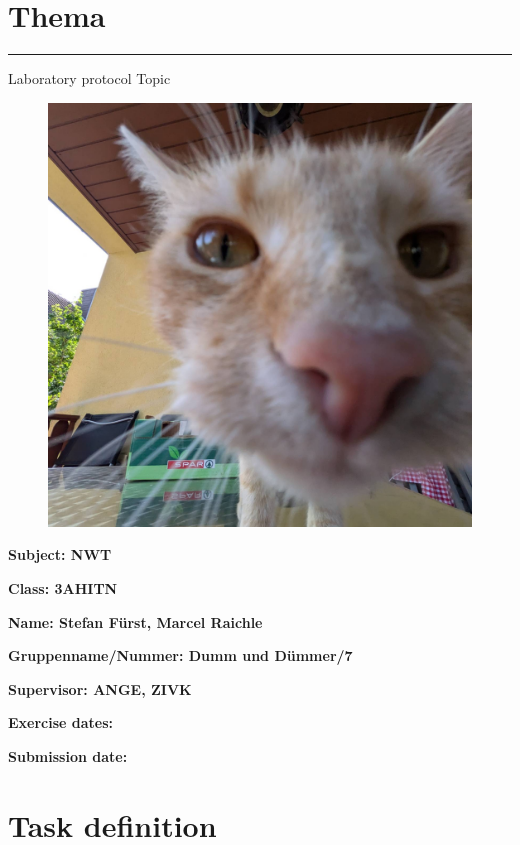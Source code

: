 \documentclass[a4paper]{article}
\newcommand{\abc}{\hfill \break}
\begin{document}

\pagestyle{oida}
\section*{Thema}
\par\noindent\rule{\textwidth}{0.4pt}

Laboratory protocol
Topic

\begin{figure}[h]
	\includegraphics[scale=0.2]{images/mika.jpeg}
	\centering
\end{figure}

\vspace*{\fill}
\bf{Subject:}	NWT\abc

\bf{Class:}	3AHITN\abc

\bf{Name:}	Stefan Fürst, Marcel Raichle\abc

\bf{Gruppenname/Nummer:} Dumm und Dümmer/7\abc

\bf{Supervisor:} 	ANGE, ZIVK\abc

\bf{Exercise dates:}	\abc

\bf{Submission date:}\abc

\abc \abc \abc \abc

\newpage
\tableofcontents

\newpage

\section{Task definition}
\end{document}
